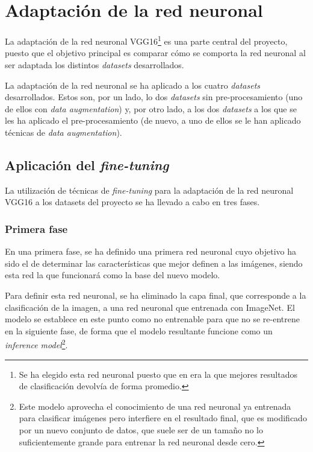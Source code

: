 \section{Adaptación de la red neuronal}

La adaptación de la red neuronal VGG16\footnote{Se ha elegido esta red neuronal puesto que en \cite{tfg_iris_2020} era la que mejores resultados de clasificación devolvía de forma promedio.} es una parte central del proyecto, puesto que el objetivo principal es comparar cómo se comporta la red neuronal al ser adaptada los distintos \textit{datasets} desarrollados.

La adaptación de la red neuronal se ha aplicado a los cuatro \textit{datasets} desarrollados. Estos son, por un lado, lo dos \textit{datasets} sin pre-procesamiento (uno de ellos con \textit{data augmentation}) y, por otro lado, a los dos \textit{datasets} a los que se les ha aplicado el pre-procesamiento (de nuevo, a uno de ellos se le han aplicado técnicas de \textit{data augmentation}). 
\subsection{Aplicación del \textit{fine-tuning}}

La utilización de técnicas de \textit{fine-tuning} para la adaptación de la red neuronal VGG16 a los datasets del proyecto se ha llevado a cabo en tres fases. 

\subsubsection{Primera fase}
En una primera fase, se ha definido una primera red neuronal cuyo objetivo ha sido el de determinar las características que mejor definen a las imágenes, siendo esta red la que funcionará como la base del nuevo modelo. 

Para definir esta red neuronal, se ha eliminado la capa final, que corresponde a la clasificación de la imagen, a una red neuronal que entrenada con ImageNet. El modelo se establece en este punto como no entrenable para que no se re-entrene en la siguiente fase, de forma que el modelo resultante funcione como un \textit{inference model}\footnote{Este modelo aprovecha el conocimiento de una red neuronal ya entrenada para clasificar imágenes pero interfiere en el resultado final, que es modificado por un nuevo conjunto de datos, que suele ser de un tamaño no lo suficientemente grande para entrenar la red neuronal desde cero.}. 

